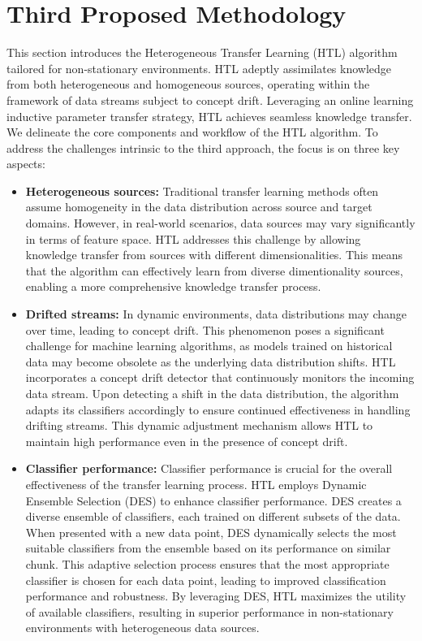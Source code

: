 \section{Third Proposed Methodology}\label{sec:6_third_proposed_approach}

This section introduces the Heterogeneous Transfer Learning (HTL) algorithm tailored for non-stationary environments. HTL adeptly assimilates knowledge from both heterogeneous and homogeneous sources, operating within the framework of data streams subject to concept drift. Leveraging an online learning inductive parameter transfer strategy, HTL achieves seamless knowledge transfer. We delineate the core components and workflow of the HTL algorithm. To address the challenges intrinsic to the third approach, the focus is on three key aspects:
\begin{itemize}
	\setlength{\itemsep}{0pt}
    \setlength{\parskip}{0pt}
	\item \textbf{Heterogeneous sources:} Traditional transfer learning methods often assume homogeneity in the data distribution across source and target domains. However, in real-world scenarios, data sources may vary significantly in terms of feature space. HTL addresses this challenge by allowing knowledge transfer from sources with different dimensionalities. This means that the algorithm can effectively learn from diverse dimentionality sources, enabling a more comprehensive knowledge transfer process.
	\item \textbf{Drifted streams:} In dynamic environments, data distributions may change over time, leading to concept drift. This phenomenon poses a significant challenge for machine learning algorithms, as models trained on historical data may become obsolete as the underlying data distribution shifts. HTL incorporates a concept drift detector that continuously monitors the incoming data stream. Upon detecting a shift in the data distribution, the algorithm adapts its classifiers accordingly to ensure continued effectiveness in handling drifting streams. This dynamic adjustment mechanism allows HTL to maintain high performance even in the presence of concept drift.
	\item \textbf{Classifier performance:} Classifier performance is crucial for the overall effectiveness of the transfer learning process. HTL employs Dynamic Ensemble Selection (DES) to enhance classifier performance. DES creates a diverse ensemble of classifiers, each trained on different subsets of the data. When presented with a new data point, DES dynamically selects the most suitable classifiers from the ensemble based on its performance on similar chunk. This adaptive selection process ensures that the most appropriate classifier is chosen for each data point, leading to improved classification performance and robustness. By leveraging DES, HTL maximizes the utility of available classifiers, resulting in superior performance in non-stationary environments with heterogeneous data sources.
\end{itemize}

